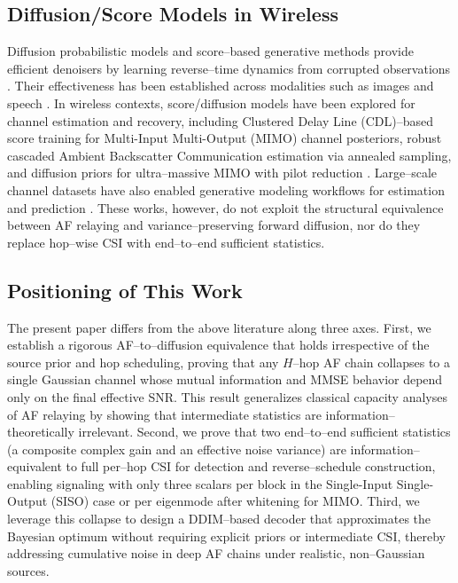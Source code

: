 \documentclass[journal]{IEEEtran}
\begin{document}
\subsection{Diffusion/Score Models in Wireless}
Diffusion probabilistic models and score–based generative methods provide efficient denoisers by learning reverse–time dynamics from corrupted observations \cite{ho2020denoising,sohl2015deep}. Their effectiveness has been established across modalities such as images and speech \cite{dhariwal2021diffusion,chen2020wavegrad}. In wireless contexts, score/diffusion models have been explored for channel estimation and recovery, including Clustered Delay Line (CDL)–based score training for Multi-Input Multi-Output (MIMO) channel posteriors, robust cascaded Ambient Backscatter Communication estimation via annealed sampling, and diffusion priors for ultra–massive MIMO with pilot reduction \cite{arvinte2023score,rezaei2023ambc,zhou2024highdim}. Large–scale channel datasets have also enabled generative modeling workflows for estimation and prediction \cite{alkhateeb2020deepmimo}. These works, however, do not exploit the structural equivalence between AF relaying and variance–preserving forward diffusion, nor do they replace hop–wise CSI with end–to–end sufficient statistics.

\subsection{Positioning of This Work}
The present paper differs from the above literature along three axes.
First, we establish a rigorous AF–to–diffusion equivalence that holds irrespective of the source prior and hop scheduling, proving that any $H$–hop AF chain collapses to a single Gaussian channel whose mutual information and MMSE behavior depend only on the final effective SNR. This result generalizes classical capacity analyses of AF relaying by showing that intermediate statistics are information–theoretically irrelevant.
Second, we prove that two end–to–end sufficient statistics (a composite complex gain and an effective noise variance) are information–equivalent to full per–hop CSI for detection and reverse–schedule construction, enabling signaling with only three scalars per block in the Single-Input Single-Output (SISO) case or per eigenmode after whitening for MIMO.
Third, we leverage this collapse to design a DDIM–based decoder that approximates the Bayesian optimum without requiring explicit priors or intermediate CSI, thereby addressing cumulative noise in deep AF chains under realistic, non–Gaussian sources.
\end{document}
